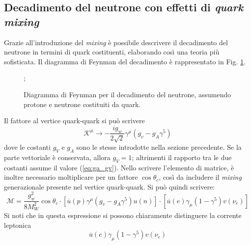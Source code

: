 \documentclass{subnucbo}
\begin{document}
\subsection{Decadimento del neutrone con effetti di \textit{quark mixing}}
Grazie all'introduzione del \textit{mixing} è possibile descrivere il decadimento del neutrone in termini di quark costituenti, elaborando così una teoria più sofisticata. Il diagramma di Feynman del decadimento è rappresentato in Fig. \ref{fig:neutron_decay_quarks}.
\begin{figure}[!h]
        \centering
        ;
        \caption{Diagramma di Feynman per il decadimento del neutrone, assumendo protone e neutrone costituiti da quark.}
        \label{fig:neutron_decay_quarks}
\end{figure}
Il fattore al vertice quark-quark si può scrivere
\begin{equation}
        \mathcal { K } ^ { \mu } \rightarrow - \frac { i g _ { w } } { 2 \sqrt { 2 } } \gamma ^ { \mu } \left( g _ { v } - g _ { A } \gamma ^ { 5 } \right)
\end{equation}
dove le costanti $g_{V}$ e $g_{A}$ sono le stesse introdotte nella sezione precedente. Se la parte vettoriale è conservata, allora $g_{V} = 1$; altrimenti il rapporto tra le due costanti assume il valore (\ref{eq:ga_gv}). Nello scrivere l'elemento di matrice, è inoltre necessario moltiplicare per un fattore $\cos\theta_{c}$, così da includere il \textit{mixing} generazionale presente nel vertice quark-quark. Si può quindi scrivere:
\begin{equation}
        \mathcal { M } = \frac { g _ { w } ^ { 2 } } { 8 M _ { W } ^ { 2 } } \cos\theta_{c} \cdot \left[ \overline { u } ( p ) \gamma ^ { \mu } \left( g _ { v } - g _ { A } \gamma ^ { 5 } \right) u ( n ) \right] \cdot \left[ \overline { u } ( e ) \gamma _ { \mu } \left( 1 - \gamma ^ { 5 } \right) v \left( \nu _ { e } \right) \right]
        \label{eq:neutron_complex_matrix_element}
\end{equation}
Si noti che in questa espressione si possono chiaramente distinguere la corrente leptonica
\begin{equation}
        \overline { u } ( e ) \gamma _ { \mu } \left( 1 - \gamma ^ { 5 } \right) v \left( \nu _ { e } \right)
        \label{eq:leptonic_current}
\end{equation}
\end{document}
